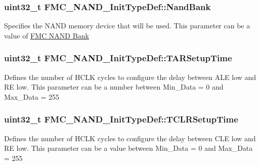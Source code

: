 \subsubsection[{\texorpdfstring{Nand\+Bank}{NandBank}}]{\setlength{\rightskip}{0pt plus 5cm}uint32\+\_\+t F\+M\+C\+\_\+\+N\+A\+N\+D\+\_\+\+Init\+Type\+Def\+::\+Nand\+Bank}\hypertarget{struct_f_m_c___n_a_n_d___init_type_def_ade342163a8ca0ad3651cc870b3368d6c}{}\label{struct_f_m_c___n_a_n_d___init_type_def_ade342163a8ca0ad3651cc870b3368d6c}
Specifies the N\+A\+ND memory device that will be used. This parameter can be a value of \hyperlink{group___f_m_c___n_a_n_d___bank}{F\+MC N\+A\+ND Bank} 
\subsubsection[{\texorpdfstring{T\+A\+R\+Setup\+Time}{TARSetupTime}}]{\setlength{\rightskip}{0pt plus 5cm}uint32\+\_\+t F\+M\+C\+\_\+\+N\+A\+N\+D\+\_\+\+Init\+Type\+Def\+::\+T\+A\+R\+Setup\+Time}\hypertarget{struct_f_m_c___n_a_n_d___init_type_def_a9bc5349964a50606c1ce4da4931b21d7}{}\label{struct_f_m_c___n_a_n_d___init_type_def_a9bc5349964a50606c1ce4da4931b21d7}
Defines the number of H\+C\+LK cycles to configure the delay between A\+LE low and RE low. This parameter can be a number between Min\+\_\+\+Data = 0 and Max\+\_\+\+Data = 255 
\subsubsection[{\texorpdfstring{T\+C\+L\+R\+Setup\+Time}{TCLRSetupTime}}]{\setlength{\rightskip}{0pt plus 5cm}uint32\+\_\+t F\+M\+C\+\_\+\+N\+A\+N\+D\+\_\+\+Init\+Type\+Def\+::\+T\+C\+L\+R\+Setup\+Time}\hypertarget{struct_f_m_c___n_a_n_d___init_type_def_a92b101e748404ea12ea1f83456108129}{}\label{struct_f_m_c___n_a_n_d___init_type_def_a92b101e748404ea12ea1f83456108129}
Defines the number of H\+C\+LK cycles to configure the delay between C\+LE low and RE low. This parameter can be a value between Min\+\_\+\+Data = 0 and Max\+\_\+\+Data = 255 
